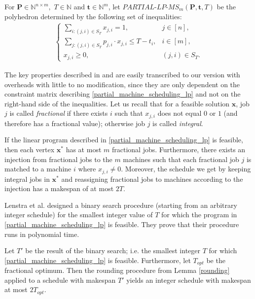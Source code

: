 \documentclass[a4paper,UKenglish,cleveref, autoref, thm-restate, pdfa]{lipics-v2021}
\theoremstyle{plain}
\begin{document}
\begin{definition}
    For $\bm{P} \in \mathbb{N}^{n\times m}, \,\, T \in \mathbb{N}$ and $\bm{t} \in \mathbb{N}^m$, let $PARTIAL\text{-}LP\text{-}MS_m(\bm{P}, \bm{t}, T)$ be the polyhedron determined by the following set of inequalities:
    \begin{align}\label{partial_machine_scheduling_lp}
        \begin{cases}
            \sum\limits_{i: (j,i) \in S_T} x_{j,i} = 1, & j\in [n], \\
            \sum\limits_{j: (j,i) \in S_T} p_{j,i} \cdot  x_{j,i} \le T-t_i, & i \in [m], \\
            x_{j,i} \ge 0, & (j,i) \in S_T.
        \end{cases}
    \end{align}
    \label{def:binary_search_poly}
\end{definition}

The key properties described in \cite{lenstra_shmoys_tardos} and \cite{vazirani} are easily transcribed to our version with overheads with little to no modification, since they are only dependent on the constraint matrix describing \eqref{partial_machine_scheduling_lp} and not on the right-hand side of the inequalities. Let us recall that for a feasible solution $\bm{x}$, job $j$ is called \emph{fractional} if there exists $i$ such that $x_{j,i}$ does not equal $0$ or $1$ (and therefore has a fractional value); otherwise job $j$ is called \emph{integral}.

\begin{lmm}\label{rounding}
    If the linear program described in \eqref{partial_machine_scheduling_lp} is feasible, then each vertex $\bm{x}^*$ has at most $m$ fractional jobs. Furthermore, there exists an injection from fractional jobs to the $m$ machines such that each fractional job $j$ is matched to a machine $i$ where $x_{j,i}\ne 0$. Moreover, the schedule we get by keeping integral jobs in $\bm{x}^*$ and reassigning fractional jobs to machines according to the injection has a makespan of at most $2T$.
\end{lmm}

Lenstra et al. designed a binary search procedure (starting from an arbitrary integer schedule) for the smallest integer value of $T$ for which the program in \eqref{partial_machine_scheduling_lp} is feasible. They prove that their procedure runs in polynomial time.

\begin{prop}\label{2_approx_machine}
    Let $T'$ be the result of the binary search; i.e. the smallest integer $T$ for which \eqref{partial_machine_scheduling_lp} is feasible. Furthermore, let $T_{opt}$ be the fractional optimum. Then the rounding procedure from Lemma \ref{rounding} applied to a schedule with makespan $T'$ yields an integer schedule with makespan at most $2T_{opt}$.
\end{prop}
\end{document}
